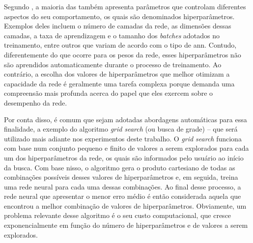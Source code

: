 
Segundo , a maioria das  também apresenta parâmetros que controlam diferentes aspectos do seu comportamento, os quais são denominados hiperparâmetros.
Exemplos deles incluem o número de camadas da rede, as dimensões dessas camadas, a taxa de aprendizagem e o tamanho dos \textit{batches} adotados no treinamento, entre outros que variam de acordo com o tipo de \acrshort{ann}.
Contudo, diferentemente do que ocorre para os pesos da rede, esses hiperparâmetros não são aprendidos automaticamente durante o processo de treinamento. 
Ao contrário, a escolha dos valores de hiperparâmetros que melhor otimizam a capacidade da rede é geralmente uma tarefa complexa porque demanda uma compreensão mais profunda acerca do papel que eles exercem sobre o desempenho da rede.



Por conta disso, é comum que sejam adotadas abordagens automáticas para essa finalidade, a exemplo do algoritmo \textit{grid search} (ou busca de grade) -- que será utilizado mais adiante nos experimentos deste trabalho.
O \textit{grid search} funciona com base num conjunto pequeno e finito de valores a serem explorados para cada um dos hiperparâmetros da rede, os quais são informados pelo usuário ao início da busca.
Com base nisso, o algoritmo gera o produto cartesiano de todas as combinações possíveis desses valores de hiperparâmetros e, em seguida, treina uma rede neural para cada uma dessas combinações.
Ao final desse processo, a rede neural que apresentar o menor erro médio é então considerada aquela que encontrou a melhor combinação de valores de hiperparâmetros.
Obviamente, um problema relevante desse algoritmo é o seu custo computacional, que cresce exponencialmente em função do número de hiperparâmetros e de valores a serem explorados.

